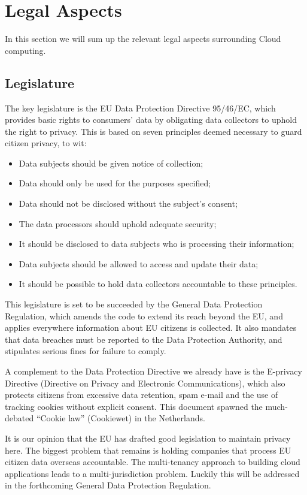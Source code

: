 \documentclass[11pt]{article}
\begin{document}
\section{Legal Aspects}
In this section we will sum up the relevant legal aspects surrounding Cloud computing.

\subsection{Legislature}
The key legislature is the EU Data Protection Directive 95/46/EC, which provides basic rights to consumers' data by obligating data collectors to uphold the right to privacy. \cite{directive199595}
This is based on seven principles deemed necessary to guard citizen privacy, to wit:
\begin{itemize}
\item Data subjects should be given notice of collection;
\item Data should only be used for the purposes specified;
\item Data should not be disclosed without the subject's consent;
\item The data processors should uphold adequate security;
\item It should be disclosed to data subjects who is processing their information;
\item Data subjects should be allowed to access and update their data;
\item It should be possible to hold data collectors accountable to these principles.
\end{itemize}

This legislature is set to be succeeded by the General Data Protection Regulation, which amends the code to extend its reach beyond the EU, and applies everywhere information about EU citizens is collected.
It also mandates that data breaches must be reported to the Data Protection Authority, and stipulates serious fines for failure to comply.

A complement to the Data Protection Directive we already have is the E-privacy Directive (Directive on Privacy and Electronic Communications), which also protects citizens from excessive data retention, spam e-mail and the use of tracking cookies without explicit consent.
This document spawned the much-debated ``Cookie law'' (Cookiewet) in the Netherlands.

It is our opinion that the EU has drafted good legislation to maintain privacy here.
The biggest problem that remains is holding companies that process EU citizen data overseas accountable.
The multi-tenancy approach to building cloud applications leads to a multi-jurisdiction problem.
Luckily this will be addressed in the forthcoming General Data Protection Regulation.
\end{document}

